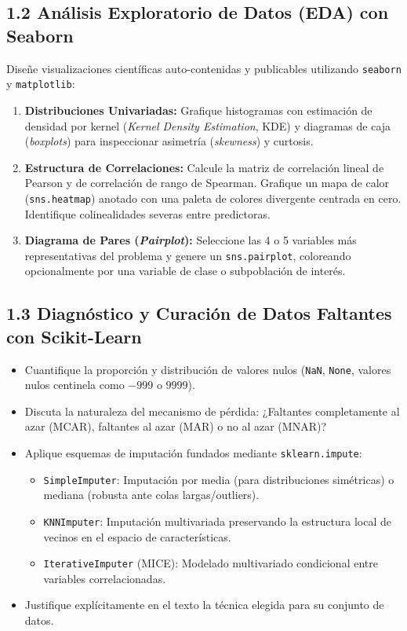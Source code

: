 \documentclass[11pt,a4paper]{article}
\begin{document}
\subsection{1.2 Análisis Exploratorio de Datos (EDA) con Seaborn}
Diseñe visualizaciones científicas auto-contenidas y publicables utilizando \texttt{seaborn} y \texttt{matplotlib}:
\begin{enumerate}[leftmargin=*,itemsep=3pt]
    \item \textbf{Distribuciones Univariadas:} Grafique histogramas con estimación de densidad por kernel (\textit{Kernel Density Estimation}, KDE) y diagramas de caja (\textit{boxplots}) para inspeccionar asimetría (\textit{skewness}) y curtosis.
    \item \textbf{Estructura de Correlaciones:} Calcule la matriz de correlación lineal de Pearson y de correlación de rango de Spearman. Grafique un mapa de calor (\texttt{sns.heatmap}) anotado con una paleta de colores divergente centrada en cero. Identifique colinealidades severas entre predictoras.
    \item \textbf{Diagrama de Pares (\textit{Pairplot}):} Seleccione las 4 o 5 variables más representativas del problema y genere un \texttt{sns.pairplot}, coloreando opcionalmente por una variable de clase o subpoblación de interés.
\end{enumerate}

\subsection{1.3 Diagnóstico y Curación de Datos Faltantes con Scikit-Learn}
\begin{itemize}[leftmargin=*,itemsep=2pt]
    \item Cuantifique la proporción y distribución de valores nulos (\texttt{NaN}, \texttt{None}, valores nulos centinela como $-999$ o $9999$).
    \item Discuta la naturaleza del mecanismo de pérdida: ¿Faltantes completamente al azar (MCAR), faltantes al azar (MAR) o no al azar (MNAR)?
    \item Aplique esquemas de imputación fundados mediante \texttt{sklearn.impute}:
    \begin{itemize}[itemsep=1pt]
        \item \texttt{SimpleImputer}: Imputación por media (para distribuciones simétricas) o mediana (robusta ante colas largas/outliers).
        \item \texttt{KNNImputer}: Imputación multivariada preservando la estructura local de vecinos en el espacio de características.
        \item \texttt{IterativeImputer} (MICE): Modelado multivariado condicional entre variables correlacionadas.
    \end{itemize}
    \item Justifique explícitamente en el texto la técnica elegida para su conjunto de datos.
\end{itemize}
\end{document}
